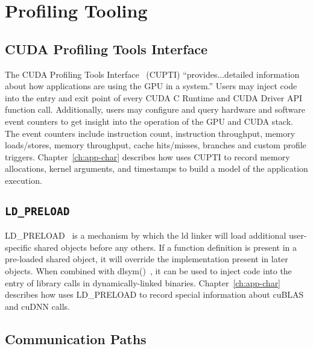 %
%
%
\section{Profiling Tooling}

\subsection{CUDA Profiling Tools Interface}
\label{sec:cupti}

The CUDA Profiling Tools Interface~\cite{nvidia2017cupti} (CUPTI) ``provides...detailed information about how applications are using the GPU in a system.''
Users may inject code into the entry and exit point of every CUDA C Runtime and CUDA Driver API function call.
Additionally, users may configure and query hardware and software event counters to get insight into the operation of the GPU and CUDA stack.
The event counters include instruction count, instruction throughput, memory loads/stores, memory throughput, cache hits/misses, branches and custom profile triggers.
Chapter~\ref{ch:app-char} describes how  uses CUPTI to record memory allocations, kernel arguments, and timestamps to build a model of the application execution.

\subsection{\texttt{LD\_PRELOAD}}
\label{sec:ldpreload}

LD\_PRELOAD~\cite{kerrisk2017ld} is a mechanism by which the ld linker will load additional user-specific shared objects before any others.
If a function definition is present in a pre-loaded shared object, it will override the implementation present in later objects.
When combined with dlsym()~\cite{kerrisk2017dlysm}, it can be used to inject code into the entry of library calls in dynamically-linked binaries.
Chapter~\ref{ch:app-char} describes how  uses LD\_PRELOAD to record special information about cuBLAS and cuDNN calls.

\cite{kerrisk2017ld}

\subsection{ Communication Paths}

